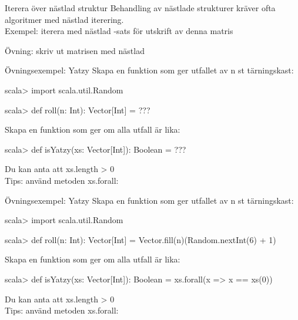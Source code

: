 \begin{Slide}{Iterera över nästlad struktur}\SlideFontSmall
  \vspace{1em}
  Behandling av nästlade strukturer kräver ofta algoritmer med nästlad iterering. \\
  Exempel: iterera med nästlad -sats för utskrift av denna matris \\

Övning: skriv ut matrisen med nästlad \\
\pause
{}
\end{Slide}


\begin{Slide}{Övningsexempel: Yatzy}\SlideFontSmall
Skapa en funktion  som ger utfallet av n st tärningskast:
\begin{REPL}
scala> import scala.util.Random

scala> def roll(n: Int): Vector[Int] = ???
\end{REPL}

Skapa en funktion  som ger  om alla utfall är lika:
\begin{REPL}
scala> def isYatzy(xs: Vector[Int]): Boolean = ???
\end{REPL}
Du kan anta att xs.length > 0\\
Tips: använd metoden xs.forall: \\
\end{Slide}


\begin{Slide}{Övningsexempel: Yatzy}\SlideFontSmall
Skapa en funktion  som ger utfallet av n st tärningskast:
\begin{REPL}
scala> import scala.util.Random

scala> def roll(n: Int): Vector[Int] = Vector.fill(n)(Random.nextInt(6) + 1)
\end{REPL}

Skapa en funktion  som ger  om alla utfall är lika:
\begin{REPL}
scala> def isYatzy(xs: Vector[Int]): Boolean = xs.forall(x => x == xs(0))
\end{REPL}
Du kan anta att xs.length > 0\\
Tips: använd metoden xs.forall: \\
\end{Slide}

